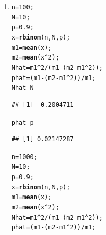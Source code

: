 \documentclass[11pt]{article}\usepackage[]{graphicx}\usepackage[dvipsnames]{xcolor}
\makeatletter
\newcommand{\hlnum}[1]{\textcolor[rgb]{0.686,0.059,0.569}{#1}}%
\newcommand{\hlopt}[1]{\textcolor[rgb]{0,0,0}{#1}}%
\newcommand{\hldef}[1]{\textcolor[rgb]{0.345,0.345,0.345}{#1}}%
\newcommand{\hlkwb}[1]{\textcolor[rgb]{0.69,0.353,0.396}{#1}}%
\newcommand{\hlkwd}[1]{\textcolor[rgb]{0.737,0.353,0.396}{\textbf{#1}}}%
\newenvironment{kframe}{%
 \def\at@end@of@kframe{}%
 \ifinner\ifhmode%
  \def\at@end@of@kframe{\end{minipage}}%
  \begin{minipage}{\columnwidth}%
 \fi\fi%
 \def\FrameCommand##1{\hskip\@totalleftmargin \hskip-\fboxsep
 \colorbox{shadecolor}{##1}\hskip-\fboxsep
     \hskip-\linewidth \hskip-\@totalleftmargin \hskip\columnwidth}%
 \MakeFramed {\advance\hsize-\width
   \@totalleftmargin\z@ \linewidth\hsize
   \@setminipage}}%
 {\par\unskip\endMakeFramed%
 \at@end@of@kframe}
\newenvironment{knitrout}{}{} %
\theoremstyle{problemstyle}
\makeatother
\begin{document}
\begin{enumerate}[label=\arabic*.]
\begin{enumerate}[label=(\alph*)]
\begin{knitrout}
\begin{kframe}
\begin{alltt}
\hldef{Nhat} \hlopt{-} \hldef{N}
\end{alltt}
\begin{verbatim}
## [1] 2.006175
\end{verbatim}
\begin{alltt}
\hldef{phat} \hlopt{-} \hldef{p}
\end{alltt}
\begin{verbatim}
## [1] -0.04010101
\end{verbatim}
\end{kframe}
\end{knitrout}
        It does change, the error is much smaller now.
        \item 
\begin{knitrout}
\color{fgcolor}\begin{kframe}
\begin{alltt}
\hldef{n} \hlkwb{=} \hlnum{100}\hldef{;}
\hldef{N} \hlkwb{=} \hlnum{10}\hldef{;}
\hldef{p} \hlkwb{=} \hlnum{0.9}\hldef{;}
\hldef{x} \hlkwb{=} \hlkwd{rbinom}\hldef{(n,N,p);}
\hldef{m1} \hlkwb{=} \hlkwd{mean}\hldef{(x);}
\hldef{m2} \hlkwb{=} \hlkwd{mean}\hldef{(x}\hlopt{^}\hlnum{2}\hldef{);}
\hldef{Nhat} \hlkwb{=} \hldef{m1}\hlopt{^}\hlnum{2} \hlopt{/} \hldef{(m1} \hlopt{-} \hldef{(m2} \hlopt{-} \hldef{m1}\hlopt{^}\hlnum{2}\hldef{));}
\hldef{phat} \hlkwb{=} \hldef{(m1} \hlopt{-} \hldef{(m2} \hlopt{-} \hldef{m1}\hlopt{^}\hlnum{2}\hldef{))} \hlopt{/} \hldef{m1;}
\hldef{Nhat} \hlopt{-} \hldef{N}
\end{alltt}
\begin{verbatim}
## [1] -0.2004711
\end{verbatim}
\begin{alltt}
\hldef{phat} \hlopt{-} \hldef{p}
\end{alltt}
\begin{verbatim}
## [1] 0.02147287
\end{verbatim}
\begin{alltt}
\hldef{n} \hlkwb{=} \hlnum{1000}\hldef{;}
\hldef{N} \hlkwb{=} \hlnum{10}\hldef{;}
\hldef{p} \hlkwb{=} \hlnum{0.9}\hldef{;}
\hldef{x} \hlkwb{=} \hlkwd{rbinom}\hldef{(n,N,p);}
\hldef{m1} \hlkwb{=} \hlkwd{mean}\hldef{(x);}
\hldef{m2} \hlkwb{=} \hlkwd{mean}\hldef{(x}\hlopt{^}\hlnum{2}\hldef{);}
\hldef{Nhat} \hlkwb{=} \hldef{m1}\hlopt{^}\hlnum{2} \hlopt{/} \hldef{(m1} \hlopt{-} \hldef{(m2} \hlopt{-} \hldef{m1}\hlopt{^}\hlnum{2}\hldef{));}
\hldef{phat} \hlkwb{=} \hldef{(m1} \hlopt{-} \hldef{(m2} \hlopt{-} \hldef{m1}\hlopt{^}\hlnum{2}\hldef{))} \hlopt{/} \hldef{m1;}

\end{alltt}
\end{kframe}
\end{knitrout}
\end{enumerate}
\end{enumerate}
\end{document}
